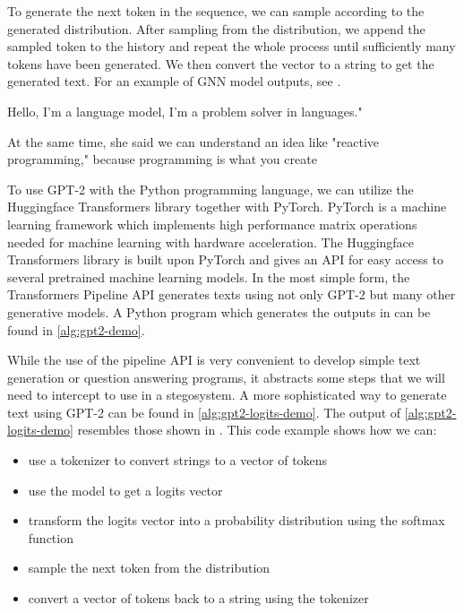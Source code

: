 To generate the next token in the sequence, we can sample according to the generated distribution.
After sampling from the distribution, we append the sampled token to the history and repeat the whole process until sufficiently many tokens have been generated.
We then convert the vector to a string to get the generated text.
For an example of GNN model outputs, see .

\begin{example}
	Hello, I'm a language model, I'm a problem solver in languages."

	At the same time, she said we can understand an idea like "reactive programming," because programming is what you create
	\label{example:gpt2-output-sample}
\end{example}

To use GPT-2 with the Python programming language, we can utilize the Huggingface Transformers library together with PyTorch.
PyTorch is a machine learning framework which implements high performance matrix operations needed for machine learning with hardware acceleration.
The Huggingface Transformers library is built upon PyTorch and gives an API for easy access to several pretrained machine learning models.
In the most simple form, the Transformers Pipeline API generates texts using not only GPT-2 but many other generative models.
A Python program which generates the outputs in  can be found in \autoref{alg:gpt2-demo}.


While the use of the pipeline API is very convenient to develop simple text generation or question answering programs, it abstracts some steps that we will need to intercept to use in a stegosystem.
A more sophisticated way to generate text using GPT-2 can be found in \autoref{alg:gpt2-logits-demo}.
The output of \autoref{alg:gpt2-logits-demo} resembles those shown in . 
This code example shows how we can:

\begin{itemize}
	\item use a tokenizer to convert strings to a vector of tokens
	\item use the model to get a logits vector
	\item transform the logits vector into a probability distribution using the softmax function
	\item sample the next token from the distribution
	\item convert a vector of tokens back to a string using the tokenizer
\end{itemize}

